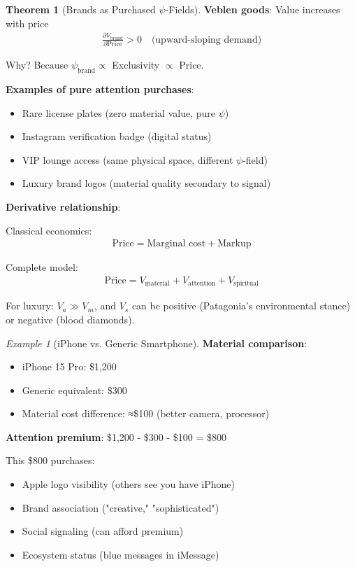 \documentclass[11pt,a4paper]{article}
\theoremstyle{definition}
\newtheorem{theorem}{Theorem}[section]
\theoremstyle{remark}
\newtheorem{example}{Example}[section]
\begin{document}
\begin{small}
\begin{enumerate}
\begin{theorem}[Brands as Purchased \(\psi\)-Fields]
\textbf{Veblen goods}: Value increases with price
\begin{align}
\frac{\partial V_{\text{brand}}}{\partial \text{Price}} > 0 \quad \text{(upward-sloping demand)}
\end{align}

Why? Because \(\psi_{\text{brand}} \propto\) Exclusivity \(\propto\) Price.

\textbf{Examples of pure attention purchases}:
\begin{itemize}
    \item Rare license plates (zero material value, pure \(\psi\))
    \item Instagram verification badge (digital status)
    \item VIP lounge access (same physical space, different \(\psi\)-field)
    \item Luxury brand logos (material quality secondary to signal)
\end{itemize}

\textbf{Derivative relationship}:

Classical economics:
\begin{align}
\text{Price} = \text{Marginal cost} + \text{Markup}
\end{align}

Complete model:
\begin{align}
\text{Price} = V_{\text{material}} + V_{\text{attention}} + V_{\text{spiritual}}
\end{align}

For luxury: \(V_a \gg V_m\), and \(V_s\) can be positive (Patagonia's environmental stance) or negative (blood diamonds).
\end{theorem}

\begin{example}[iPhone vs. Generic Smartphone]
\textbf{Material comparison}:
\begin{itemize}
    \item iPhone 15 Pro: \$1,200
    \item Generic equivalent: \$300
    \item Material cost difference: ≈\$100 (better camera, processor)
\end{itemize}

\textbf{Attention premium}: \$1,200 - \$300 - \$100 = \$800

This \$800 purchases:
\begin{itemize}
    \item Apple logo visibility (others see you have iPhone)
    \item Brand association ("creative," "sophisticated")
    \item Social signaling (can afford premium)
    \item Ecosystem status (blue messages in iMessage)
\end{itemize}


\end{example}
\end{enumerate}
\end{small}
\end{document}

